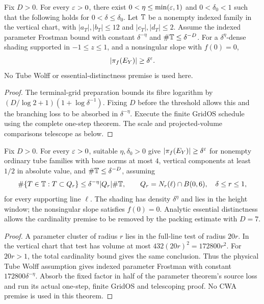 \begin{theorem}
\label{thm:twisted-parameter-polynomial}
\leanok
{}
Fix $D>0$. For every $\varepsilon>0$, there exist
$0<\eta\leq\min(\varepsilon,1)$ and $0<\delta_0<1$ such that the following
holds for $0<\delta\leq\delta_0$. Let $\mathbb{T}$ be a nonempty indexed family
in the vertical chart, with
$|a_T|,|b_T|\leq12$ and $|c_T|,|d_T|\leq2$.
Assume the indexed parameter Frostman bound with constant $\delta^{-\eta}$
and $\#\mathbb{T}\leq\delta^{-D}$. For a $\delta^\eta$-dense shading supported
in $-1\leq z\leq1$, and a nonsingular slope with $f(0)=0$,
\[
                         |\pi_f(E_Y)|\geq\delta^\varepsilon.
\]
No Tube Wolff or essential-distinctness premise is used here.
\end{theorem}
\begin{proof}
\leanok
{}
The terminal-grid preparation bounds its fibre logarithm by
$(D/\log2+1)(1+\log\delta^{-1})$. Fixing $D$ before the threshold
allows this and the branching loss to be absorbed in $\delta^{-\eta}$.
Execute the finite GridOS schedule using the complete one-step theorem.
The scale and projected-volume comparisons telescope as below.
\end{proof}

\begin{theorem}
\label{thm:twisted-full-line}
\leanok
{}
Fix $D>0$. For every $\varepsilon>0$, suitable $\eta,\delta_0>0$ give
$|\pi_f(E_Y)|\geq\delta^\varepsilon$ for nonempty ordinary tube families
with base norms at most $4$, vertical components at least $1/2$ in
absolute value, and $\#\mathbb{T}\leq\delta^{-D}$, assuming
\[
 \#\{T\in\mathbb{T}:T\subset Q_r\}
       \leq\delta^{-\eta}|Q_r|\#\mathbb{T},
 \qquad Q_r=N_r(\ell)\cap B(0,6),\quad \delta\leq r\leq1,
\]
for every supporting line $\ell$. The shading has density $\delta^\eta$
and lies in the height window; the nonsingular slope satisfies $f(0)=0$.
Analytic essential distinctness allows the cardinality premise to be
removed by the packing estimate with $D=7$.
\end{theorem}
\begin{proof}
\leanok
A parameter cluster of radius $r$ lies in the full-line test of radius
$20r$. In the vertical chart that test has volume at most
$432(20r)^2=172800r^2$. For $20r>1$, the total cardinality bound
gives the same conclusion. Thus the physical Tube Wolff assumption
gives indexed parameter Frostman with constant $172800\delta^{-\eta}$.
Absorb the fixed factor in half of the parameter theorem's source loss
and run its actual one-step, finite GridOS and telescoping proof.
No CWA premise is used in this theorem.
\end{proof}

